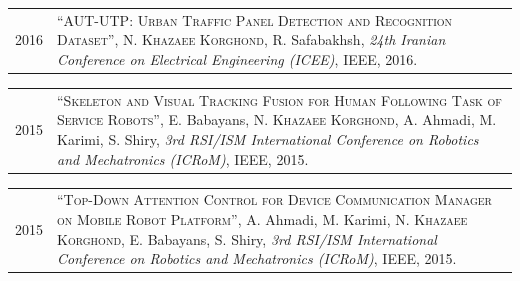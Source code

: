 %


\vspace{2mm}


\begin{tabularx}{\textwidth}{r X}
  2016 &
  \textsc{``AUT-UTP: Urban Traffic Panel Detection and Recognition Dataset''},
  \textsc{N. Khazaee Korghond}, R. Safabakhsh,
  \textit{24th Iranian Conference on Electrical Engineering (ICEE)}, IEEE, 2016.
\end{tabularx}

\vspace{2mm}

\begin{tabularx}{\textwidth}{r X}
  2015 &
  \textsc{``Skeleton and Visual Tracking Fusion for Human Following Task of Service Robots''},
  E. Babayans, \textsc{N. Khazaee Korghond}, A. Ahmadi, M. Karimi, S. Shiry,
  \textit{3rd RSI/ISM International Conference on Robotics and Mechatronics (ICRoM)}, IEEE, 2015.
\end{tabularx}

\vspace{2mm}

\begin{tabularx}{\textwidth}{r X}
  2015 &
  \textsc{``Top-Down Attention Control for Device Communication Manager on Mobile Robot Platform''},
  A. Ahmadi, M. Karimi, \textsc{N. Khazaee Korghond}, E. Babayans, S. Shiry,
  \textit{3rd RSI/ISM International Conference on Robotics and Mechatronics (ICRoM)}, IEEE, 2015.
\end{tabularx}

